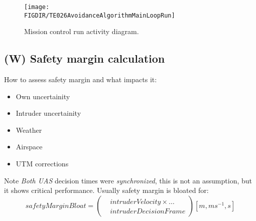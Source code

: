     \begin{figure}[H]
        \centering
        \texttt{[image: \\FIGDIR/TE026AvoidanceAlgorithmMainLoopRun]}
        \caption{Mission control run activity diagram.}
        \label{fig:missionControlRunActivityDiagram}
    \end{figure}

\subsection{(W) Safety margin calculation}\label{s:safetyMarginCalculation}
    How to assess safety margin and what impacts it:
    \begin{itemize}
        \item Own uncertainity 
        \item Intruder uncertainity 
        \item Weather
        \item Airspace
        \item UTM corrections
    \end{itemize}
    
    Note \emph{Both UAS} decision times were \emph{synchronized}, this is not an assumption, but it shows critical performance. Usually safety margin is bloated for:
            \begin{equation}\label{safetyMarginBloat}
                safetyMarginBloat = \left( \begin{aligned}
                &intruderVelocity \times\dots \\ &intruderDecisionFrame \end{aligned}\right)[m,ms^{-1},s]
            \end{equation}
